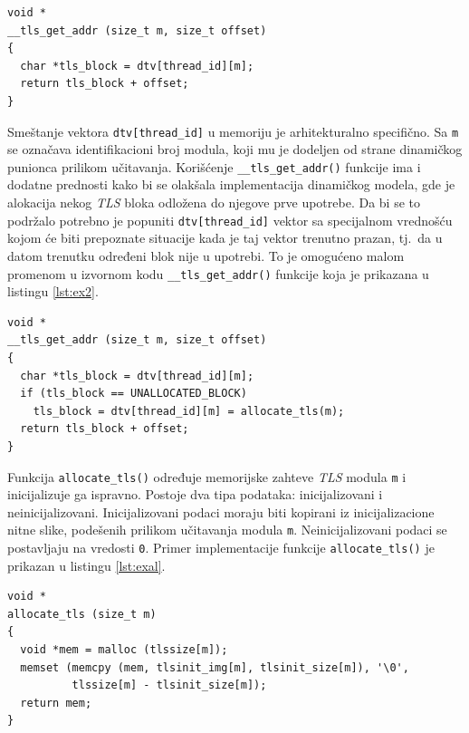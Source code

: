 \documentclass[12pt,oneside]{memoir}
\begin{document}
\begin{lstlisting}[style=customc, label={lst:ex1}, caption={Implementacija funkcije \texttt{\_\_tls\_get\_addr()}}]
void *
__tls_get_addr (size_t m, size_t offset)
{
  char *tls_block = dtv[thread_id][m];
  return tls_block + offset;
}

\end{lstlisting}

Smeštanje vektora \texttt{dtv[thread\_id]} u memoriju je arhitekturalno specifično. Sa \texttt{m} se označava identifikacioni broj modula, koji mu je dodeljen od strane dinamičkog punionca prilikom učitavanja. Korišćenje \texttt{\_\_tls\_get\_addr()} funkcije ima i dodatne prednosti kako bi se olakšala implementacija dinamičkog modela, gde je alokacija nekog \emph{TLS} bloka odložena do njegove prve upotrebe. Da bi se to podržalo potrebno je popuniti \texttt{dtv[thread\_id]} vektor sa specijalnom vrednošću kojom će biti prepoznate situacije kada je taj vektor trenutno prazan, tj.~da u datom trenutku određeni blok nije u upotrebi. To je omogućeno malom promenom u izvornom kodu \texttt{\_\_tls\_get\_addr()} funkcije koja je prikazana u listingu \ref{lst:ex2}.

\begin{lstlisting}[style=customc, label={lst:ex2}, caption={Promena implementacije funkcije \texttt{\_\_tls\_get\_addr()}}]
void *
__tls_get_addr (size_t m, size_t offset)
{
  char *tls_block = dtv[thread_id][m];
  if (tls_block == UNALLOCATED_BLOCK)
    tls_block = dtv[thread_id][m] = allocate_tls(m);
  return tls_block + offset;
}

\end{lstlisting}

Funkcija \texttt{allocate\_tls()} određuje memorijske zahteve \emph{TLS} modula \texttt{m} i inicijalizuje ga ispravno. Postoje dva tipa podataka: inicijalizovani i neinicijalizovani. Inicijalizovani podaci moraju biti kopirani iz inicijalizacione nitne slike, podešenih prilikom učitavanja modula \texttt{m}. Neinicijalizovani podaci se postavljaju na vredosti \texttt{0}. Primer implementacije funkcije \texttt{allocate\_tls()} je prikazan u listingu \ref{lst:exal}.\newpage

\begin{lstlisting}[style=customc, label={lst:exal}, caption={Implementacija funkcije \texttt{allocate\_tls()}}]
void *
allocate_tls (size_t m)
{
  void *mem = malloc (tlssize[m]);
  memset (memcpy (mem, tlsinit_img[m], tlsinit_size[m]), '\0',
          tlssize[m] - tlsinit_size[m]);
  return mem;
}

\end{lstlisting}
\end{document}
